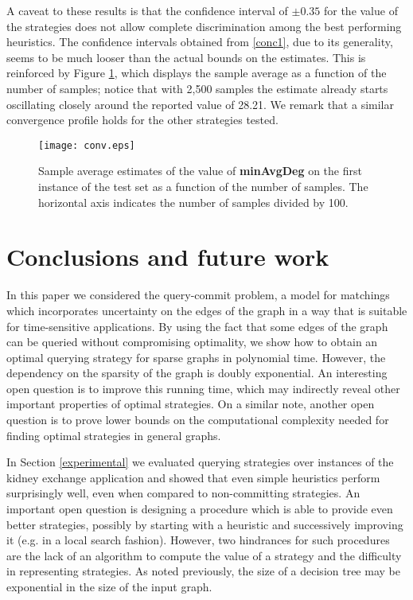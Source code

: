 \documentclass[12pt]{article}
\begin{document}
		A caveat to these results is that the confidence interval of $\pm 0.35$ for the value of the strategies does not allow complete discrimination among the best performing heuristics. The confidence intervals obtained from \eqref{conc1}, due to its generality, seems to be much looser than the actual bounds on the estimates. This is reinforced by Figure \ref{fig:conv}, which displays the sample average as a function of the number of samples; notice that with 2,500 samples the estimate already starts oscillating closely around the reported value of 28.21. We remark that a similar convergence profile holds for the other strategies tested.
		
		
\begin{figure}
	\centering
		\texttt{[image: conv.eps]}
	\caption{Sample average estimates of the value of {\bf minAvgDeg} on the first instance of the test set as a function of the number of samples. The horizontal axis indicates the number of samples divided by 100.}
	\label{fig:conv}
\end{figure}

		\section{Conclusions and future work} \label{conclusion}
		
		In this paper we considered the query-commit problem, a model for matchings which incorporates uncertainty on the edges of the graph in a way that is suitable for time-sensitive applications. By using the fact that some edges of the graph can be queried without compromising optimality, we show how to obtain an optimal querying strategy for sparse graphs in polynomial time. However, the dependency on the sparsity of the graph is doubly exponential. An interesting open question is to improve this running time, which may indirectly reveal other important properties of optimal strategies. On a similar note, another open question is to prove lower bounds on the computational complexity needed for finding optimal strategies in general graphs. 
	
		In Section \ref{experimental} we evaluated querying strategies over instances of the kidney exchange application and showed that even simple heuristics perform surprisingly well, even when compared to non-committing strategies. An important open question is designing a procedure which is able to provide even better strategies, possibly by starting with a heuristic and successively improving it (e.g. in a local search fashion). However, two hindrances for such procedures are the lack of an algorithm to compute the value of a strategy and the difficulty in representing strategies. As noted previously, the size of a decision tree may be exponential in the size of the input graph. 
	
\end{document}
